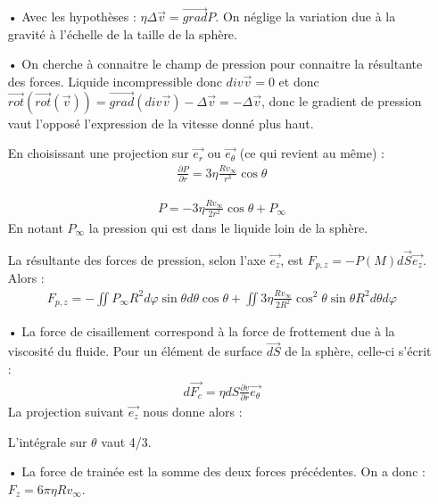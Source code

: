 \documentclass{report}
\begin{document}
\begin{itemize}
	\item[•] Avec les hypothèses : $\eta\Delta \vec{v} = \vec{grad}P$. On néglige la variation due à la gravité à l'échelle de la taille de la sphère.  
	\item[•] On cherche à connaitre le champ de pression pour connaitre la résultante des forces. 
	Liquide incompressible donc $div \vec{v}=0$ et donc $\vec{rot}(\vec{rot}(\vec{v}))=\vec{grad} (div \vec{v})-\Delta \vec{v}=-\Delta \vec{v}$, donc le gradient de pression vaut l'opposé l'expression de la vitesse donné plus haut.
	
	En choisissant une projection sur $\vec{e_r}$ ou $\vec{e_\theta}$ (ce qui revient au même) :
	\begin{align*}
		\frac{\partial P}{\partial r} = 3\eta\frac{Rv_\infty}{r^3}\cos\theta 
	\end{align*}
	
	\begin{align*}
		P = -3\eta\frac{Rv_\infty}{2r^2}\cos\theta + P_\infty
	\end{align*}
En notant $P_\infty$ la pression qui est dans le liquide loin de la sphère.

La résultante des forces de pression, selon l'axe $\vec{e_z}$, est $F_{p,z}=-P(M)d\vec{S}\vec{e_z}$. Alors :
\begin{align*}
	F_{p,z} = -\iint P_\infty R^2d\varphi \sin\theta d\theta \cos\theta + \iint 3\eta\frac{Rv_\infty}{2R^2}\cos^2\theta \sin\theta R^2d\theta d\varphi
\end{align*}
\noindent{}

\item[•] La force de cisaillement correspond à la force de frottement due à la viscosité du fluide. Pour un élément de surface $\vec{dS}$ de la sphère, celle-ci s'écrit :
\begin{align*}
	d\vec{F_c}=\eta dS \frac{\partial v}{\partial r}\vec{e_\theta}
\end{align*}
La projection suivant $\vec{e_z}$ nous donne alors :

\noindent{}
L'intégrale sur $\theta$ vaut 4/3.

\item[•] La force de trainée est la somme des deux forces précédentes. On a donc : $F_z = 6\pi\eta Rv_\infty$.
\end{itemize}
\end{document}
